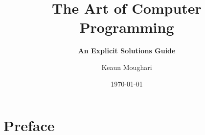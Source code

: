 \documentclass[fontsize=11pt, paper=a4]{scrbook}
\begin{document}
\frontmatter
\title{The Art of Computer Programming}
\subtitle{\Large \textbf{An Explicit Solutions Guide}}
\author{Keaun Moughari} 
\date{\today} 
\maketitle
\tableofcontents
\chapter{Preface}\label{sec:preface}


\mainmatter
{}\label{sec:linstruct}
\label{sec:arrays}
\label{sec:linkedlists}

\label{sec:nonlinstruct}
\end{document}
